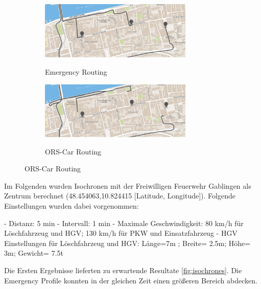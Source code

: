 \documentclass[12pt,a4paper]{article}
\begin{document}
\begin{figure}[h]
\centering
\caption{Routing in die Fußgängerzone der Heidelberger Altstadt}
\label{fig:footway}
\begin{subfigure}{0.49\textwidth}
\centering
\includegraphics[width = 0.80\textwidth]{../media/Altstadt_emergency.png} \\
\caption{Emergency Routing}
\label{fig:alteme}
\end{subfigure}
\begin{subfigure}{0.49\textwidth}
\centering
\includegraphics[width = 0.80\textwidth]{../media/Altstadt_car.png} \\
\caption{ORS-Car Routing}
\label{fig:altcar}
\end{subfigure}
\end{figure}

Im Folgenden wurden Isochronen mit der Freiwilligen Feuerwehr Gablingen als Zentrum berechnet (48.454063,10.824415 [Latitude, Longitude]). Folgende Einstellungen wurden dabei vorgenommen:

- Distanz: 5 min
- Intervall: 1 min
- Maximale Geschwindigkeit: 80 km/h für Löschfahrzeug und HGV; 130 km/h für PKW und Einsatzfahrzeug
- HGV Einstellungen für Löschfahrzeug und HGV: Länge=7m ; Breite= 2.5m; Höhe= 3m; Gewicht= 7.5t

Die Ersten Ergebnisse lieferten zu erwartende Resultate \ref{fig:isochrones}. Die Emergency Profile konnten in der gleichen Zeit einen größeren Bereich abdecken.
\end{document}

